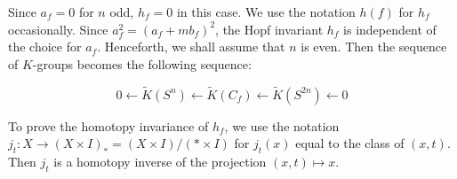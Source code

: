 Since $a_f = 0$ for $n$ odd, $h_f = 0$ in this case. We use the notation $h(f)$ for $h_f$ occasionally. Since $a_f^2 = (a_f + mb_f)^2$, the Hopf invariant $h_f$ is independent of the choice for $a_f$. Henceforth, we shall assume that $n$ is even. Then the sequence of $K$-groups becomes the following sequence:

$$0 \leftarrow \tilde{K}(S^n) \leftarrow \tilde{K}(C_f) \leftarrow \tilde{K}(S^{2n}) \leftarrow 0$$

To prove the homotopy invariance of $h_f$, we use the notation $j_t: X \rightarrow (X \times I)_* = (X \times I)/(* \times I)$ for $j_t(x)$ equal to the class of $(x, t)$. Then $j_t$ is a homotopy inverse of the projection $(x, t) \mapsto x$.
